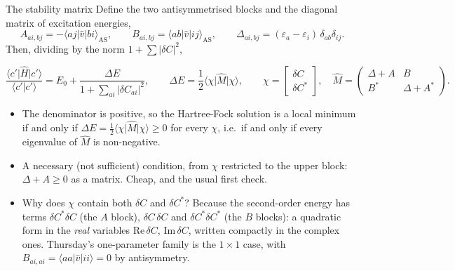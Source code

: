 \documentclass[aspectratio=169,10pt]{beamer}
\newcommand{\ket}[1]{\vert #1\rangle}
\newcommand{\bra}[1]{\langle #1\vert}
\newcommand{\braket}[2]{\langle #1\vert #2\rangle}
\newcommand{\element}[3]{\langle #1\vert #2\vert #3\rangle}
\begin{document}
\begin{frame}{The stability matrix}
  \footnotesize
  Define the two antisymmetrised blocks and the diagonal matrix of excitation energies,
  \[
    A_{ai,bj}=-\element{aj}{\hat{v}}{bi}_{\mathrm{AS}},\qquad
    B_{ai,bj}=\element{ab}{\hat{v}}{ij}_{\mathrm{AS}},\qquad
    \Delta_{ai,bj}=(\varepsilon_a-\varepsilon_i)\,\delta_{ab}\delta_{ij}.
  \]
  Then, dividing by the norm $1+\sum|\delta C|^2$,
  \begin{block}{}
    \[
      \frac{\element{c'}{\hat{H}}{c'}}{\braket{c'}{c'}}=E_0+\frac{\Delta E}{1+\sum_{ai}|\delta C_{ai}|^2},
      \qquad
      \Delta E=\frac12\bra{\chi}\hat{M}\ket{\chi},
      \qquad
      \chi=\begin{bmatrix}\delta C\\ \delta C^{*}\end{bmatrix},\quad
      \hat{M}=\begin{pmatrix}\Delta+A & B\\ B^{*} & \Delta+A^{*}\end{pmatrix}.
    \]
  \end{block}
  \begin{itemize}
    \item The denominator is positive, so \alert{the Hartree-Fock solution is a local minimum if and only if $\Delta E=\frac12\bra{\chi}\hat{M}\ket{\chi}\ge0$ for every $\chi$}, i.e.\ if and only if every eigenvalue of $\hat{M}$ is non-negative.
    \item A necessary (not sufficient) condition, from $\chi$ restricted to the upper block: $\Delta+A\ge0$ as a matrix. Cheap, and the usual first check.
    \item Why does $\chi$ contain both $\delta C$ and $\delta C^{*}$? Because the second-order energy has terms $\delta C^{*}\delta C$ (the $A$ block), $\delta C\,\delta C$ and $\delta C^{*}\delta C^{*}$ (the $B$ blocks): a quadratic form in the \emph{real} variables $\mathrm{Re}\,\delta C$, $\mathrm{Im}\,\delta C$, written compactly in the complex ones. Thursday's one-parameter family is the $1\times1$ case, with $B_{ai,ai}=\element{aa}{\hat{v}}{ii}=0$ by antisymmetry.
  \end{itemize}
\end{frame}
\end{document}
